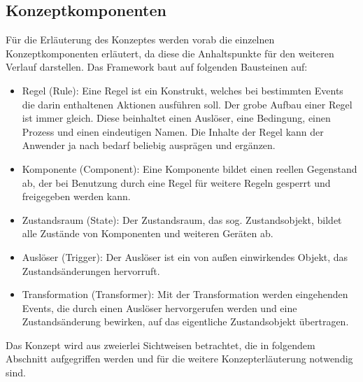     \subsection{Konzeptkomponenten}
    \label{subsec:conceptcomps}
        Für die Erläuterung des Konzeptes werden vorab die einzelnen Konzeptkomponenten erläutert, da diese die Anhaltspunkte 
        für den weiteren Verlauf darstellen. Das Framework baut auf folgenden Bausteinen auf:
        \begin{itemize} 
            \item Regel (Rule): Eine Regel ist ein Konstrukt, welches bei bestimmten Events die darin enthaltenen Aktionen ausführen soll. 
            Der grobe Aufbau einer Regel ist immer gleich. Diese beinhaltet einen Auslöser, eine Bedingung, einen Prozess und einen eindeutigen 
            Namen. Die Inhalte der Regel kann der Anwender ja nach bedarf beliebig ausprägen und ergänzen. 
            \item Komponente (Component): Eine Komponente bildet einen reellen Gegenstand ab, der bei Benutzung durch eine Regel für weitere Regeln 
            gesperrt und freigegeben werden kann. 
            \item Zustandsraum (State): Der Zustandsraum, das sog. Zustandsobjekt, bildet alle Zustände von Komponenten und weiteren Geräten ab. 
            \item Auslöser (Trigger): Der Auslöser ist ein von außen einwirkendes Objekt, das Zustandsänderungen hervorruft.
            \item Transformation (Transformer): Mit der Transformation werden eingehenden Events, die durch einen Auslöser hervorgerufen 
            werden und eine Zustandsänderung bewirken, auf das eigentliche Zustandsobjekt übertragen. 
        \end{itemize}
        Das Konzept wird aus zweierlei Sichtweisen betrachtet, die in folgendem Abschnitt aufgegriffen werden und für die weitere 
        Konzepterläuterung notwendig sind.
    

